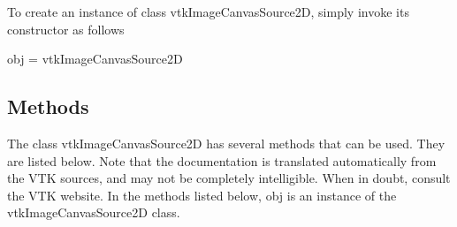 To create an instance of class vtk\-Image\-Canvas\-Source2\-D, simply invoke its constructor as follows \begin{DoxyVerb}  obj = vtkImageCanvasSource2D
\end{DoxyVerb}
 \hypertarget{vtkwidgets_vtkxyplotwidget_Methods}{}\subsection{Methods}\label{vtkwidgets_vtkxyplotwidget_Methods}
The class vtk\-Image\-Canvas\-Source2\-D has several methods that can be used. They are listed below. Note that the documentation is translated automatically from the V\-T\-K sources, and may not be completely intelligible. When in doubt, consult the V\-T\-K website. In the methods listed below, {\ttfamily obj} is an instance of the vtk\-Image\-Canvas\-Source2\-D class. 
